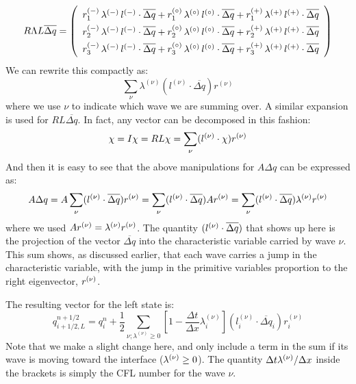 \begin{equation}
\renewcommand{\arraystretch}{1.5}
R\Lambda L \overline{\Delta q} =
   \left ( \begin{array}{c}
            r_1^\evm \, \lambda^\evm \, l^\evm \cdot \overline{\Delta q} +
            r_1^\evz \, \lambda^\evz \, l^\evz \cdot \overline{\Delta q} +
            r_1^\evp \, \lambda^\evp \, l^\evp \cdot \overline{\Delta q} \\
%
            r_2^\evm \, \lambda^\evm \, l^\evm \cdot \overline{\Delta q} +
            r_2^\evz \, \lambda^\evz \, l^\evz \cdot \overline{\Delta q} +
            r_2^\evp \, \lambda^\evp \, l^\evp \cdot \overline{\Delta q} \\
%
            r_3^\evm \, \lambda^\evm \, l^\evm \cdot \overline{\Delta q} +
            r_3^\evz \, \lambda^\evz \, l^\evz \cdot \overline{\Delta q} +
            r_3^\evp \, \lambda^\evp \, l^\evp \cdot \overline{\Delta q} \\
   \end{array} \right )
\renewcommand{\arraystretch}{1.0}
\end{equation}
We can rewrite this compactly as:
\begin{equation}
\sum_\nu \lambda^{(\nu)} (l^{(\nu)} \cdot \overline{\Delta q}) r^{(\nu)}
\end{equation}
where we use $\nu$ to indicate which wave we are summing over.  A similar
expansion is used for $RL \overline{\Delta q}$.  In fact, any vector
can be decomposed in this fashion:
\begin{equation}
\chi = I \chi = R L \chi = \sum_\nu (l^{(\nu)} \cdot \chi) r^{(\nu)}
\end{equation}
And then it is easy to see that the above manipulations for $A \Delta q$
can be expressed as:
\begin{equation}
A \Delta q =  A \sum_\nu (l^{(\nu)} \cdot \overline{\Delta q}) r^{(\nu)} = \sum_\nu (l^{(\nu)} \cdot \overline{\Delta q}) A r^{(\nu)} = \sum_\nu (l^{(\nu)} \cdot \overline{\Delta q}) \lambda^{(\nu)} r^{(\nu)}
\end{equation}
where we used $A r^{(\nu)} = \lambda^{(\nu)} r^{(\nu)}$.  The quantity $(l^{(\nu)}
\cdot \overline{\Delta q})$ that shows up here is the projection of
the vector $\overline{\Delta q}$ into the characteristic variable
carried by wave $\nu$.  This sum shows, as discussed earlier, that each wave
carries a jump in the characteristic variable, with the jump in the primitive
variables proportion to the right eigenvector, $r^{(\nu)}$.

The resulting vector
for the left state is:
\begin{equation}
q_{i+1/2,L}^{n+1/2} = q_i^n + \frac{1}{2} \sum_{\nu; \lambda^{(\nu)} \ge 0}
  \left [ 1 - \frac{\Delta t}{\Delta x} \lambda_i^{(\nu)} \right ] (l_i^{(\nu)} \cdot \overline{\Delta q}_i) r_i^{(\nu)}
\end{equation}
Note that we make a slight change here, and only include a term in the sum if
its wave is moving toward the interface ($\lambda^{(\nu)} \ge 0$).  The quantity
$\Delta t \lambda^{(\nu)}/\Delta x$ inside the brackets is simply the CFL
number for the wave $\nu$.

